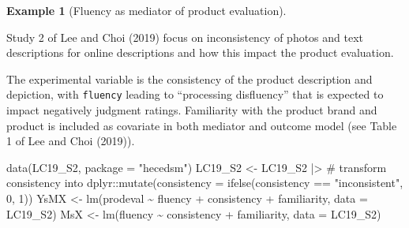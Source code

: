 \documentclass[
  11pt,
  letterpaper,
]{scrbook}
\newenvironment{Shaded}{\begin{snugshade}}{\end{snugshade}}
\newcommand{\AttributeTok}[1]{\textcolor[rgb]{0.40,0.45,0.13}{#1}}
\newcommand{\CommentTok}[1]{\textcolor[rgb]{0.37,0.37,0.37}{#1}}
\newcommand{\DecValTok}[1]{\textcolor[rgb]{0.68,0.00,0.00}{#1}}
\newcommand{\FunctionTok}[1]{\textcolor[rgb]{0.28,0.35,0.67}{#1}}
\newcommand{\NormalTok}[1]{\textcolor[rgb]{0.00,0.23,0.31}{#1}}
\newcommand{\OtherTok}[1]{\textcolor[rgb]{0.00,0.23,0.31}{#1}}
\newcommand{\SpecialCharTok}[1]{\textcolor[rgb]{0.37,0.37,0.37}{#1}}
\newcommand{\StringTok}[1]{\textcolor[rgb]{0.13,0.47,0.30}{#1}}
\theoremstyle{definition}
\theoremstyle{definition}
\newtheorem{example}{Example}[chapter]
\theoremstyle{remark}
\begin{document}
\begin{example}[Fluency as mediator of product
evaluation]\protect\hypertarget{exm-inconsistency}{}\label{exm-inconsistency}

Study 2 of Lee and Choi (2019) focus on inconsistency of photos and text
descriptions for online descriptions and how this impact the product
evaluation.

The experimental variable is the consistency of the product description
and depiction, with \texttt{fluency} leading to ``processing
disfluency'' that is expected to impact negatively judgment ratings.
Familiarity with the product brand and product is included as covariate
in both mediator and outcome model (see Table 1 of Lee and Choi (2019)).

\begin{Shaded}
\begin{Highlighting}[]
\FunctionTok{data}\NormalTok{(LC19\_S2, }\AttributeTok{package =} \StringTok{"hecedsm"}\NormalTok{)}
\NormalTok{LC19\_S2 }\OtherTok{\textless{}{-}}\NormalTok{ LC19\_S2 }\SpecialCharTok{|\textgreater{}} \CommentTok{\# transform consistency into }
\NormalTok{ dplyr}\SpecialCharTok{::}\FunctionTok{mutate}\NormalTok{(}\AttributeTok{consistency =} \FunctionTok{ifelse}\NormalTok{(consistency }\SpecialCharTok{==} \StringTok{"inconsistent"}\NormalTok{, }\DecValTok{0}\NormalTok{, }\DecValTok{1}\NormalTok{))}
\NormalTok{YsMX }\OtherTok{\textless{}{-}} \FunctionTok{lm}\NormalTok{(prodeval }\SpecialCharTok{\textasciitilde{}}\NormalTok{ fluency }\SpecialCharTok{+}\NormalTok{ consistency }\SpecialCharTok{+}\NormalTok{ familiarity,}
           \AttributeTok{data =}\NormalTok{ LC19\_S2)}
\NormalTok{MsX }\OtherTok{\textless{}{-}} \FunctionTok{lm}\NormalTok{(fluency }\SpecialCharTok{\textasciitilde{}}\NormalTok{ consistency }\SpecialCharTok{+}\NormalTok{ familiarity,}
           \AttributeTok{data =}\NormalTok{ LC19\_S2)}
\end{Highlighting}
\end{Shaded}

\begin{table}

\caption{\label{tbl-coefsmediation}Model coefficients}

\begin{minipage}{0.50\linewidth}


\end{minipage}
\end{table}
\end{example}
\end{document}
